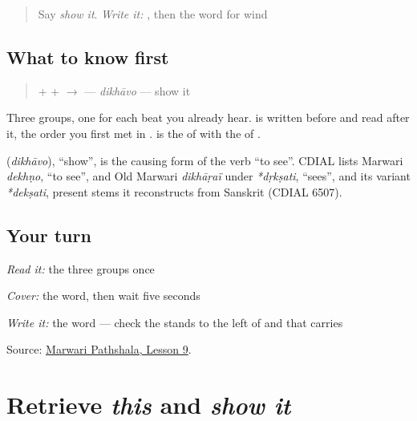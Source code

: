 \label{lesson:MW-C21-dikhavo}



\begin{quote}
Say \emph{show it}. \emph{Write it:} \textbf{}, then the word for wind
\end{quote}

\subsection*{What to know first}
\begin{quote}
\textbf{} + \textbf{} + \textbf{} $\to$ \textbf{} — \emph{dikhāvo} — show it
\end{quote}

Three groups, one for each beat you already hear. \textbf{} is written before \textbf{} and read after it, the order you first met in \textbf{}. \textbf{} is the \textbf{} of \textbf{} with the \textbf{} of \textbf{}.

\begin{cousinweb}
\textbf{} (\emph{dikhāvo}), \textquotedblleft{}show\textquotedblright{}, is the causing form of the verb \textquotedblleft{}to see\textquotedblright{}. CDIAL lists Marwari \emph{dekhṇo}, \textquotedblleft{}to see\textquotedblright{}, and Old Marwari \emph{dikhāṛaï} under \emph{*dṛkṣati}, \textquotedblleft{}sees\textquotedblright{}, and its variant \emph{*dekṣati}, present stems it reconstructs from Sanskrit (CDIAL 6507).
\end{cousinweb}

\subsection*{Your turn}
\emph{Read it:} the three groups once

\emph{Cover:} the word, then wait five seconds

\emph{Write it:} the word — check the \textbf{} stands to the left of \textbf{} and that \textbf{} carries \textbf{}

\begin{tcolorbox}[breakable,colback=teal!4,colframe=teal!35!black,title={Before you move on}]
Source: \href{https://www.marwaripathshala.com/marwari-lesson-9-english}{Marwari Pathshala, Lesson 9}.
\end{tcolorbox}
\section[Practice]{Retrieve \emph{this} and \emph{show it}}

